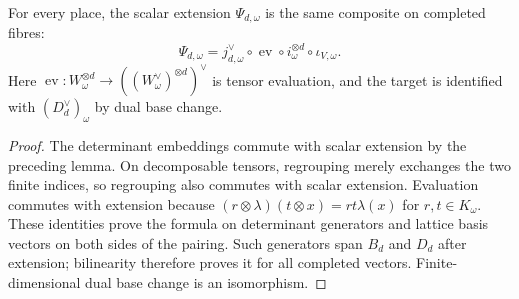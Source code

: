 \begin{lemma}
\label{lem:contraction-pairing-base-change}
\leanok
For every place, the scalar extension $\Psi_{d,\omega}$ is the same
composite on completed fibres:
\[
 \Psi_{d,\omega}=j_{d,\omega}^{\vee}\circ
     \operatorname{ev}\circ i_\omega^{\otimes d}\circ\iota_{V,\omega}.
\]
Here $\operatorname{ev}:W_\omega^{\otimes d}\to
((W_\omega^\vee)^{\otimes d})^\vee$ is tensor evaluation, and the target
is identified with $(D_d^\vee)_\omega$ by dual base change.
\end{lemma}
\begin{proof}
The determinant embeddings commute with scalar extension by the preceding
lemma. On decomposable tensors, regrouping merely exchanges the two finite
indices, so regrouping also commutes with scalar extension.
Evaluation commutes with extension because
$(r\otimes\lambda)(t\otimes x)=rt\lambda(x)$ for $r,t\in K_\omega$.
These identities prove the formula on determinant generators and lattice
basis vectors on both sides of the pairing. Such generators span $B_d$ and
$D_d$ after extension; bilinearity therefore proves it for all completed
vectors. Finite-dimensional dual base change is an isomorphism.
\end{proof}

